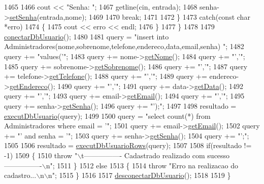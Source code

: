 \begin{DoxyCode}
1465 
1466       cout << \textcolor{stringliteral}{"Senha: "};
1467       getline(cin, entrada);
1468       senha->\mbox{\hyperlink{class_senha_a01bbc2a82c5f405b68f33fe0dc538ec1}{setSenha}}(entrada,nome);
1469 
1470       \textcolor{keywordflow}{break};
1471 
1472     \}
1473     \textcolor{keywordflow}{catch}(\textcolor{keyword}{const} \textcolor{keywordtype}{char} *erro)
1474     \{
1475       cout << erro << endl;
1476     \}
1477   \}
1478 
1479   \mbox{\hyperlink{comando_sql_8cpp_a4f89ddcbc4cf8f2587d89f72f8c7900d}{conectarDbUsuario}}();
1480 
1481   query = \textcolor{stringliteral}{"insert into Administradores(nome,sobrenome,telefone,endereco,data,email,senha) "};
1482   query += \textcolor{stringliteral}{"values('"};
1483   query += nome->\mbox{\hyperlink{class_nome_aad41176173eec20cbbae1576447a3697}{getNome}}();
1484   query += \textcolor{stringliteral}{"','"};
1485   query += sobrenome->\mbox{\hyperlink{class_sobrenome_a954491366ce07f6715f32a97d67edf04}{getSobrenome}}();
1486   query += \textcolor{stringliteral}{"','"};
1487   query += telefone->\mbox{\hyperlink{class_telefone_a3e7acb7a3b658ef9e5d73b7e1d2948e7}{getTelefone}}();
1488   query += \textcolor{stringliteral}{"','"};
1489   query += endereco->\mbox{\hyperlink{class_endereco_aa1ccbda52f9559a68379c54e7e914d19}{getEndereco}}();
1490   query += \textcolor{stringliteral}{"','"};
1491   query += data->\mbox{\hyperlink{class_data_afc7b15a5e81334858e48709b2f45cdc3}{getData}}();
1492   query += \textcolor{stringliteral}{"','"};
1493   query += email->\mbox{\hyperlink{class_email_aa9a0e1a66b4efde65cf017bdd1c6c625}{getEmail}}();
1494   query += \textcolor{stringliteral}{"','"};
1495   query += senha->\mbox{\hyperlink{class_senha_a8786b3d03b1652e73df1cdce46cbbaaf}{getSenha}}();
1496   query += \textcolor{stringliteral}{"');"};
1497 
1498   resultado = \mbox{\hyperlink{comando_sql_8cpp_a748197580e7f9acdbf48c78de1f7924b}{executDbUsuario}}(query);
1499 
1500   query = \textcolor{stringliteral}{"select count(*) from Administradores where email = '"};
1501   query += email->\mbox{\hyperlink{class_email_aa9a0e1a66b4efde65cf017bdd1c6c625}{getEmail}}();
1502   query += \textcolor{stringliteral}{"' and senha = '"};
1503   query += senha->\mbox{\hyperlink{class_senha_a8786b3d03b1652e73df1cdce46cbbaaf}{getSenha}}();
1504   query += \textcolor{stringliteral}{"';"};
1505 
1506   resultado = \mbox{\hyperlink{comando_sql_8cpp_af54952694f2fa7d76f969fb74b853cb9}{executDbUsuarioRows}}(query);
1507 
1508   \textcolor{keywordflow}{if}(resultado != -1)
1509   \{
1510     \textcolor{keywordflow}{throw} \textcolor{stringliteral}{"\(\backslash\)t---------------- Cadastrado realizado com sucesso ----------------\(\backslash\)n"};
1511   \}
1512   \textcolor{keywordflow}{else}
1513   \{
1514     \textcolor{keywordflow}{throw} \textcolor{stringliteral}{"Erro na realizacao do cadastro...\(\backslash\)n\(\backslash\)n"};
1515   \}
1516 
1517 \mbox{\hyperlink{comando_sql_8cpp_a969be9911913568e30d4ae8963338bc3}{desconectarDbUsuario}}();
1518 
1519 \}
\end{DoxyCode}

